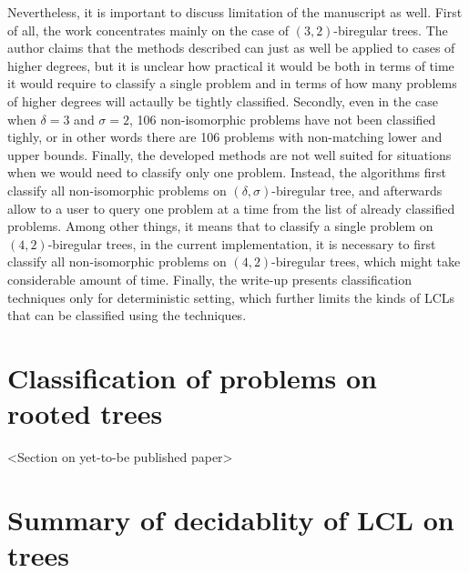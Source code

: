 Nevertheless, it is important to discuss limitation of the manuscript as well. First of all,
the work concentrates mainly on the case of $(3, 2)$-biregular trees. The author claims that
the methods described can just as well be applied to cases of higher degrees, but it is unclear
how practical it would be both in terms of time it would require to classify a single problem
and in terms of how many problems of higher degrees will actaully be tightly classified. Secondly,
even in the case when $\delta = 3$ and $\sigma = 2$, 106 non-isomorphic problems have not been
classified tighly, or in other words there are 106 problems with non-matching lower and upper bounds.
Finally, the developed methods are not well suited for situations when we would need to
classify only one problem. Instead, the algorithms first classify all non-isomorphic
problems on $(\delta, \sigma)$-biregular tree, and afterwards allow to a user to query
one problem at a time from the list of already classified problems. Among other things,
it means that to classify a single problem on $(4, 2)$-biregular trees, in the current
implementation, it is necessary to first classify all non-isomorphic problems on $(4, 2)$-biregular trees,
which might take considerable amount of time. Finally, the write-up presents classification
techniques only for deterministic setting, which further limits the kinds of LCLs that
can be classified using the techniques.

\section{Classification of problems on rooted trees}

<Section on yet-to-be published paper>

\section{Summary of decidablity of LCL on trees}

